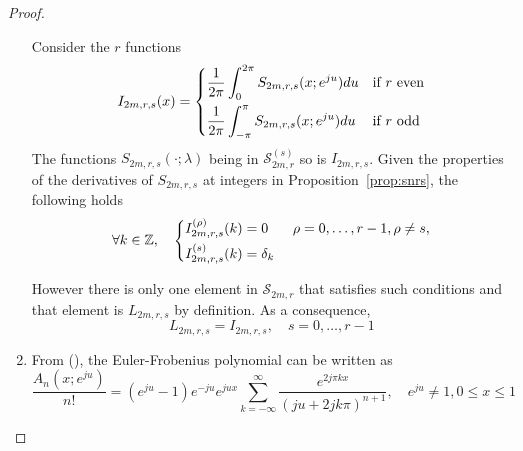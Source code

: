 \begin{proof}
\begin{enumerate}
    Consider the $r$ functions
    \begin{equation}\label{eq:def-I}
      I_{2m,r,s}(x) = \begin{dcases}
	\frac{1}{2\pi} \int_0^{2\pi} S_{2m, r, s}(x;e^{ju}) du & \text{if $r$ even} \\
	\frac{1}{2\pi} \int_{-\pi}^{\pi} S_{2m, r, s}(x;e^{ju}) du & \text{if $r$ odd} \\
      \end{dcases}
    \end{equation}
    The functions $S_{2m,r,s}(\cdot;\lambda)$ being in $\mathscr{S}_{2m,r}^{(s)}$ so is $I_{2m,r,s}$. Given the 
    properties of the derivatives of $S_{2m,r,s}$ at integers in Proposition~\ref{prop:snrs}, the following holds 
    \begin{equation*}
      \forall k \in \mathbb{Z}, \quad 
      \begin{dcases}
	I_{2m,r,s}^{(\rho)}(k) = 0 & \ \rho=0, \ldots, r-1, \rho \neq s,  \\
	I_{2m,r,s}^{(s)}(k) = \delta_k &
      \end{dcases}
    \end{equation*}
    
    However there is only one element in $\mathscr{S}_{2m,r}$ that satisfies such conditions and that element is 
    $L_{2m,r,s}$ by definition. As a consequence,
    \begin{equation}
      L_{2m,r,s} = I_{2m,r,s}, \quad s=0, \ldots, r-1
    \end{equation}

    \item From (\cite[(7.14)]{Sch72b}), the Euler-Frobenius polynomial can be written as 
      \begin{equation}\label{eq:sch-an}
	\frac{A_n(x;e^{ju})}{n!} = (e^{ju}-1)e^{-ju}e^{jux} \sum_{k=-\infty}^{\infty} \frac{e^{2j\pi kx}}{{(ju + 
	2jk\pi)}^{n+1}}, \quad e^{ju} \neq 1, 0 \leq x \leq 1
    \end{equation}


\end{enumerate}
\end{proof}
